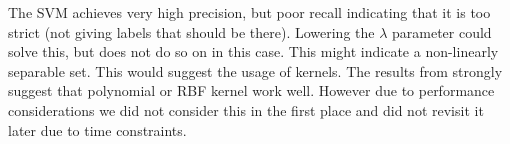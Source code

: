 \documentclass{article}
\begin{document}
The SVM achieves very high precision, but poor recall indicating that it is too strict (not giving labels that should be there). Lowering the $\lambda$ parameter could solve this, but does not do so on in this case. This might indicate a non-linearly separable set. This would suggest the usage of kernels. The results from \cite{joachims_text_1998} strongly suggest that polynomial or RBF kernel work well. However due to performance considerations we did not consider this in the first place and did not revisit it later due to time constraints.

\printbibliography
\end{document}
